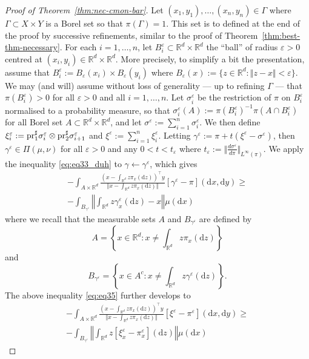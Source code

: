 \documentclass[leqno, 11pt, a4paper]{amsart}
\theoremstyle{definition}
\newcommand{\R}{\mathbb{R}}
\newcommand{\eps}{\varepsilon}
\newcommand{\pr}{{\rm pr}}
\newcommand{\dd}{\mathrm{d}}
\begin{document}
	\begin{proof}[Proof of Theorem~\ref{thm:nec-cmon-bar}]
		Let $(x_1, y_1), \dots, (x_n, y_n) \in \Gamma$ where $\Gamma \subset X \times Y$ is a Borel set so that $\pi(\Gamma) = 1$. This set is to defined at the end of the proof by successive refinements, similar to the proof of Theorem~\ref{thm:best-thm-necessary}. For each $i = 1, \dots,n$, let $B_i^\eps \subset \R^d \times \R^d$ the ``ball'' of radius $\eps > 0$ centred at $(x_i, y_i) \in \R^d \times \R^d$. More precisely, to simplify a bit the presentation, assume that $B_i^\eps:=B_\eps(x_i) \times B_\eps(y_i)$ where $B_\eps(x) := \{ z \in \R^d : \Vert z - x \Vert < \eps\}$. We may (and will) assume without loss of generality --- up to refining $\Gamma$ ---  that $\pi(B_i^\eps) > 0$ for all $\eps > 0$ and all $i =1,\dots, n$. Let $\sigma_i^\eps$ be the restriction of $\pi$ on $B_i^\eps$ normalised to a probability measure, so that $\sigma_i^\eps(A) := \pi(B_i^\eps)^{-1}\pi(A \cap B_i^\eps)$ for all Borel set $A \subset \R^d \times \R^d$, and let $\sigma^\eps := \sum_{i = 1}^n \sigma_i^\eps$. We then define $\xi_i^\eps  := \pr_1^\sharp \sigma_i^\eps \otimes \pr_2^\sharp \sigma^\eps_{i+1}$ and $\xi^\eps := \sum_{i =1}^n \xi_i^\eps$. Letting $\gamma^\eps := \pi + t(\xi^\eps - \sigma^\eps)$, then $\gamma^\eps \in \Pi(\mu, \nu)$ for all $\eps > 0$ and any $0 < t < t_\eps$ where $t_\eps := \Vert \frac{d \sigma^\eps}{d \pi} \Vert_{L^\infty(\pi)}$. We apply the inequality \eqref{eq:eq33_duh} to $\gamma \leftarrow \gamma^\eps$, which gives
	 \begin{multline}\label{eq:eq35}
	 	-\int_{A \times \R^d} \frac{(x - \int_{\R^d} z \pi_x(\dd z))^\top y}{\Vert x - \int_{\R^d} z \pi_x(\dd z) \Vert} [\gamma^\eps - \pi](\dd x, \dd y) \geq \\- \int_{B_{\gamma^\eps}} \left\Vert \int_{\R^d} z \gamma_x^\eps(\dd z) - x\right\Vert \mu(\dd x)
	 \end{multline}
	 where we recall that the measurable sets $A$ and $B_{\gamma^\eps}$ are defined by
     $$
     A = \left\{x \in \R^d : x \neq \int_{\R^d} z \pi_x(\dd z) \right\}
     $$
     and 
     \begin{equation}\label{eq:B}
     B_{\gamma^\eps} = \left\{ x \in A^c : x \neq \int_{\R^d} z \gamma^\eps(\dd z)\right\}.
     \end{equation}
     The above inequality \eqref{eq:eq35} further develops to
	 \begin{multline}\label{eq:eq36}
	 		-\int_{A \times \R^d} \frac{(x - \int_{\R^d} z \pi_x(\dd z))^\top y}{\Vert x - \int_{\R^d} z \pi_x(\dd z) \Vert} [\xi^\eps - \pi^\eps](\dd x, \dd y) \geq \\- \int_{B_{\gamma^\eps}} \left\Vert \int_{\R^d} z [\xi^\eps_x - \pi^\eps_x](\dd z) \right\Vert \mu(\dd x)

\end{multline}
\end{proof}
\end{document}
